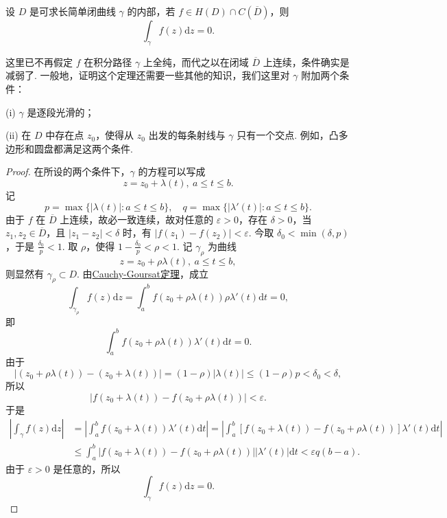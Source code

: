 \documentclass[../../main.tex]{subfiles}%
\begin{document}
\begin{theorem}\label{theorem:定理3.2.4}
设 \( D \) 是可求长简单闭曲线 \( \gamma \) 的内部，若 \( f \in H(D) \cap C(\overline{D}) \)，则
\[
\int_\gamma f(z)\mathrm{d}z = 0.
\]
\end{theorem}
\begin{remark}
这里已不再假定 \( f \) 在积分路径 \( \gamma \) 上全纯，而代之以在闭域 \( \overline{D} \) 上连续，条件确实是减弱了. 一般地，证明这个定理还需要一些其他的知识，我们这里对 \( \gamma \) 附加两个条件：

(i) \( \gamma \) 是逐段光滑的；

(ii) 在 \( D \) 中存在点 \( z_0 \)，使得从 \( z_0 \) 出发的每条射线与 \( \gamma \) 只有一个交点. 例如，凸多边形和圆盘都满足这两个条件.
\end{remark}
\begin{proof}

在所设的两个条件下，\( \gamma \) 的方程可以写成
\[
z = z_0 + \lambda(t),\ a \leqslant t \leqslant b.
\]
记
\[
p = \max\{ |\lambda(t)| : a \leqslant t \leqslant b \},
\quad
q = \max\{ |\lambda'(t)| : a \leqslant t \leqslant b \}.
\]
由于 \( f \) 在 \( \overline{D} \) 上连续，故必一致连续，故对任意的 \( \varepsilon > 0 \)，存在 \( \delta > 0 \)，当 \( z_1, z_2 \in \overline{D} \)，且 \( |z_1 - z_2| < \delta \) 时，有 \( |f(z_1) - f(z_2)| < \varepsilon \). 今取 \( \delta_0 < \min(\delta, p) \)，于是 \( \frac{\delta_0}{p} < 1 \). 取 \( \rho \)，使得 \( 1 - \frac{\delta_0}{p} < \rho < 1 \). 记 \( \gamma_\rho \) 为曲线
\[
z = z_0 + \rho\lambda(t),\ a \leqslant t \leqslant b,
\]
则显然有 \( \gamma_\rho \subset D \). 由\hyperref[theorem:Cauchy-Goursat定理(Cauchy积分定理)]{Cauchy-Goursat定理}，成立
\[
\int_{\gamma_\rho} f(z)\mathrm{d}z = \int_a^b f(z_0 + \rho\lambda(t))\rho\lambda'(t)\mathrm{d}t = 0,
\]
即
\[
\int_a^b f(z_0 + \rho\lambda(t))\lambda'(t)\mathrm{d}t = 0.
\]
由于
\[
|(z_0 + \rho\lambda(t)) - (z_0 + \lambda(t))| = (1 - \rho)|\lambda(t)|
\leqslant (1 - \rho)p
< \delta_0 < \delta,
\]
所以
\[
|f(z_0 + \lambda(t)) - f(z_0 + \rho\lambda(t))| < \varepsilon.
\]
于是
\begin{align*}
\left| \int_\gamma f(z)\mathrm{d}z \right| &= \left| \int_a^b f(z_0 + \lambda(t))\lambda'(t)\mathrm{d}t \right|
= \left| \int_a^b [f(z_0 + \lambda(t)) - f(z_0 + \rho\lambda(t))]\lambda'(t)\mathrm{d}t \right|
\\
&\leqslant \int_a^b |f(z_0 + \lambda(t)) - f(z_0 + \rho\lambda(t))||\lambda'(t)|\mathrm{d}t
< \varepsilon q(b - a).
\end{align*}
由于 \( \varepsilon > 0 \) 是任意的，所以
\[
\int_\gamma f(z)\mathrm{d}z = 0.
\]

\end{proof}
\end{document}
